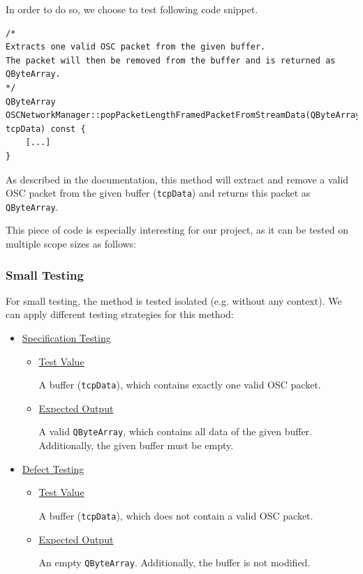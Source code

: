 \documentclass{scrreprt}
\begin{document}
In order to do so, we choose to test following code snippet.

\begin{lstlisting}[title=src/OSCNetworkManager.cpp]
/*
Extracts one valid OSC packet from the given buffer. 
The packet will then be removed from the buffer and is returned as QByteArray.
*/
QByteArray OSCNetworkManager::popPacketLengthFramedPacketFromStreamData(QByteArray& tcpData) const {
	[...]
}
\end{lstlisting}
\bigskip

As described in the documentation, this method will extract and remove a valid OSC packet from the given buffer (\texttt{tcpData}) and returns this packet as \texttt{QByteArray}.

This piece of code is especially interesting for our project, as it can be tested on multiple scope sizes as follows:

\subsubsection{Small Testing}

For small testing, the method is tested isolated (e.g. without any context). We can apply different testing strategies for this method:

\begin{itemize}
	\item[] \underline{Specification Testing} %
	
	\begin{itemize}
		\item[] \underline{Test Value}
		
		A buffer (\texttt{tcpData}), which contains exactly one valid OSC packet.
		
		\item[] \underline{Expected Output}
		
		A valid \texttt{QByteArray}, which contains all data of the given buffer. Additionally, the given buffer must be empty.
	\end{itemize}

	\item[] \underline{Defect Testing}
	
	\begin{itemize}
		\item[] \underline{Test Value}
		
		A buffer (\texttt{tcpData}), which does not contain a valid OSC packet.
		
		\item[] \underline{Expected Output}
		
		An empty \texttt{QByteArray}. Additionally, the buffer is not modified.
	\end{itemize}
\end{itemize}
\end{document}
